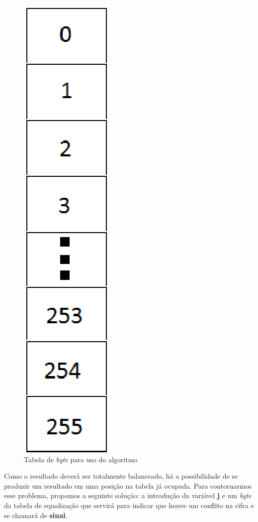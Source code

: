 \begin{figure}[h]
	\centering
	\includegraphics[scale=0.7]{figuras/tabela.eps}
	\caption{Tabela de \textit{byte} para uso do algoritmo}
\end{figure}

Como o resultado deverá ser totalmente balanceado, há a possibilidade de se produzir um resultado em uma posição na tabela já ocupada. Para contornarmos esse problema, propomos a seguinte solução: a introdução da variável \textbf{j} e um \textit{byte} da tabela de equalização que servirá para indicar que houve um conflito na cifra e se chamará de \textbf{sinal}.

